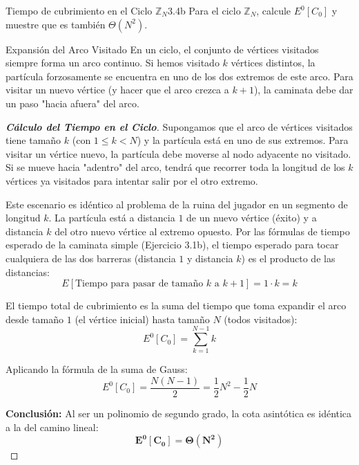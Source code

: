 \documentclass[10pt,a4paper]{article}
\begin{document}
\newpage


\begin{ejercicio}{Tiempo de cubrimiento en el Ciclo $\mathbb{Z}_N$}{3.4b}
    Para el ciclo $\mathbb{Z}_N$, calcule $E^0[C_0]$ y muestre que es también $\Theta(N^2)$.
\end{ejercicio}

\vspace{2mm}

\begin{nota}{Expansión del Arco Visitado}
    En un ciclo, el conjunto de vértices visitados siempre forma un arco continuo. Si hemos visitado $k$ vértices distintos, la partícula forzosamente se encuentra en uno de los dos extremos de este arco. Para visitar un nuevo vértice (y hacer que el arco crezca a $k+1$), la caminata debe dar un paso "hacia afuera" del arco.
\end{nota}

\begin{proof}[\textbf{Cálculo del Tiempo en el Ciclo}]
    Supongamos que el arco de vértices visitados tiene tamaño $k$ (con $1 \le k < N$) y la partícula está en uno de sus extremos.
    Para visitar un vértice nuevo, la partícula debe moverse al nodo adyacente no visitado. Si se mueve hacia "adentro" del arco, tendrá que recorrer toda la longitud de los $k$ vértices ya visitados para intentar salir por el otro extremo.
    
    Este escenario es idéntico al problema de la ruina del jugador en un segmento de longitud $k$. La partícula está a distancia $1$ de un nuevo vértice (éxito) y a distancia $k$ del otro nuevo vértice al extremo opuesto.
    Por las fórmulas de tiempo esperado de la caminata simple (Ejercicio 3.1b), el tiempo esperado para tocar cualquiera de las dos barreras (distancia $1$ y distancia $k$) es el producto de las distancias:
    \[ E[\text{Tiempo para pasar de tamaño } k \text{ a } k+1] = 1 \cdot k = k \]
    
    El tiempo total de cubrimiento es la suma del tiempo que toma expandir el arco desde tamaño $1$ (el vértice inicial) hasta tamaño $N$ (todos visitados):
    \[ E^0[C_0] = \sum_{k=1}^{N-1} k \]
    
    Aplicando la fórmula de la suma de Gauss:
    \[ E^0[C_0] = \frac{N(N-1)}{2} = \frac{1}{2}N^2 - \frac{1}{2}N \]
    
    \textbf{Conclusión:} Al ser un polinomio de segundo grado, la cota asintótica es idéntica a la del camino lineal:
    \[ \mathbf{E^0[C_0] = \Theta(N^2)} \]
\end{proof}
\end{document}
